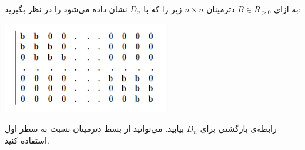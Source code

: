 \EXERCISE
به ازای
$B \in R_{>0}$
دترمینان
$n \times n$
زیر را که با
$D_n$
نشان داده می‌شود را در نظر بگیرید:
\begin{center}
\includegraphics[height=4cm]{9.png}
\end{center}
رابطه‌ی بازگشتی برای
$D_n$
بیابید. می‌توانید از بسط دترمینان نسبت به سطر اول استفاده کنید.